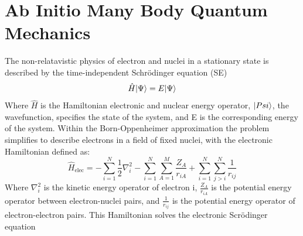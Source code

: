 
\section{Ab Initio Many Body Quantum Mechanics}
 The non-relatavistic physics of electron and nuclei in a stationary state is described by the time-independent Schr{\"o}dinger equation (SE)
   \begin{equation}\label{SE}
    \hat{H}| \Psi \rangle = E| \Psi \rangle
   \end{equation}
  Where $\hat{H}$ is the Hamiltonian electronic and nuclear energy operator, $| Psi \rangle$, the wavefunction, specifies the state of the system, and E is the corresponding energy of the system.
  Within the Born-Oppenheimer approximation\cite{SzaboAttila1982} the problem simplifies to describe electrons in a field of fixed nuclei, with the electronic Hamiltonian defined as: 
   \begin{equation}
    \hat{H}_{\text{elec}} = -\sum_{i=1}^{N} \frac{1}{2} \nabla_{i}^{2} - \sum_{i=1}^{N}\sum_{A=1}^{M} \frac{Z_A}{r_{iA}} + \sum_{i=1}^{N}\sum_{j>i}^{N} \frac{1}{r_{ij}}
   \end{equation}
  Where $\nabla_{i}^2$ is the kinetic energy operator of electron i, $\frac{Z_A}{r_{iA}}$ is the potential energy operator between electron-nuclei pairs, and $\frac{1}{r_{ij}}$ is the potential energy operator of electron-electron pairs. This Hamiltonian solves the electronic Scr{\"o}dinger equation
